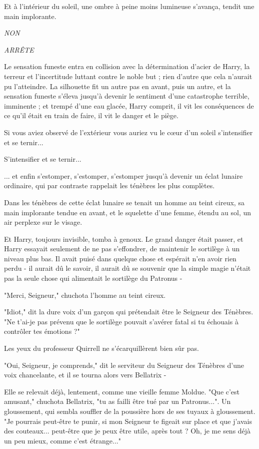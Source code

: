 Et à l'intérieur du soleil, une ombre à peine moins lumineuse s'avança, tendit une main implorante.

\emph{NON} 

\emph{ARRÊTE} 

Le sensation funeste entra en collision avec la détermination d'acier de Harry, la terreur et l'incertitude luttant contre le noble but ; rien d'autre que cela n'aurait pu l'atteindre. La silhouette fit un autre pas en avant, puis un autre, et la sensation funeste s'éleva jusqu'à devenir le sentiment d'une catastrophe terrible, imminente ; et trempé d'une eau glacée, Harry comprit, il vit les conséquences de ce qu'il était en train de faire, il vit le danger et le piège.

Si vous aviez observé de l'extérieur vous auriez vu le cœur d'un soleil s'intensifier et se ternir...

S'intensifier et se ternir...

... et enfin s'estomper, s'estomper, s'estomper jusqu'à devenir un éclat lunaire ordinaire, qui par contraste rappelait les ténèbres les plus complètes.

Dans les ténèbres de cette éclat lunaire se tenait un homme au teint cireux, sa main implorante tendue en avant, et le squelette d'une femme, étendu au sol, un air perplexe sur le visage.

Et Harry, toujours invisible, tomba à genoux. Le grand danger était passer, et Harry essayait seulement de ne pas s'effondrer, de maintenir le sortilège à un niveau plus bas. Il avait puisé dans quelque chose et espérait n'en avoir rien perdu - il aurait dû le savoir, il aurait dû se souvenir que la simple magie n'était pas la seule chose qui alimentait le sortilège du Patronus -

"Merci, Seigneur," chuchota l'homme au teint cireux.

"Idiot," dit la dure voix d'un garçon qui prétendait être le Seigneur des Ténèbres. "Ne t'ai-je pas prévenu que le sortilège pouvait s'avérer fatal si tu échouais à contrôler tes émotions ?"

Les yeux du professeur Quirrell ne s'écarquillèrent bien sûr pas.

"Oui, Seigneur, je comprends," dit le serviteur du Seigneur des Ténèbres d'une voix chancelante, et il se tourna alors vers Bellatrix -

Elle se relevait déjà, lentement, comme une vieille femme Moldue. "Que c'est amusant," chuchota Bellatrix, "tu as failli être tué par un Patronus...". Un gloussement, qui sembla souffler de la poussière hors de ses tuyaux à gloussement. "Je pourrais peut-être te punir, si mon Seigneur te figeait sur place et que j'avais des couteaux... peut-être que je peux être utile, après tout ? Oh, je me sens déjà un peu mieux, comme c'est étrange..."

